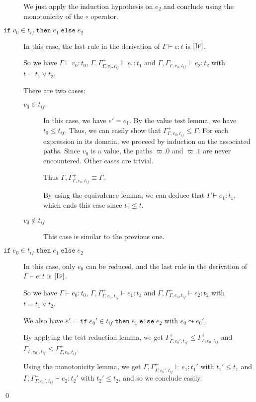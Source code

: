 \documentclass[a4paper]{article}%
\newcommand{\ite}[4]{\ensuremath{\texttt{if}\;#1\in#2\;\texttt{then}\;#3\;\texttt{else}\;#4}}
\theoremstyle{definition}
\newcommand {\Rule}[1] {[\textsc{#1}]}
\begin{document}
\begin{description}
      We just apply the induction hypothesis on $e_2$ and conclude using the monotonicity of the $\circ$ operator.
      \item[$\ite {v_0} {t_{if}} {e_1} {e_2}$] In this case, the last rule in the derivation of $\Gamma \vdash e:t$ is $\Rule{If}$.
       
      So we have $\Gamma \vdash v_0 : t_0$, $\Gamma, \Gamma^+_{\Gamma,v_0,t_{if}}\vdash e_1 : t_1$ and $\Gamma, \Gamma^-_{\Gamma,v_0,t_{if}}\vdash e_2 : t_2$ with $t=t_1\vee t_2$.

      There are two cases:
      \begin{description}
        \item[$v_0 \in t_{if}$] In this case, we have $e'=e_1$.
        By the value test lemma, we have $t_0 \leq t_{if}$.
        Thus, we can easily show that $\Gamma^+_{\Gamma,v_0,t_{if}} \leq \Gamma$:
        For each expression in its domain, we proceed by induction on the associated paths.
        Since $v_0$ is a value, the paths $\varpi.0$ and $\varpi.1$ are never encountered. Other cases are trivial.

        Thus $\Gamma, \Gamma^+_{\Gamma,v_0,t_{if}} \equiv \Gamma$.

        By using the equivalence lemma, we can deduce that $\Gamma \vdash e_1 : t_1$, which ends this case since $t_1 \leq t$.
        \item[$v_0 \not\in t_{if}$] This case is similar to the previous one.
      \end{description}
        
      \item[$\ite {e_0} {t_{if}} {e_1} {e_2}$] In this case, only $e_0$ can be reduced, and the last rule in the derivation of $\Gamma \vdash e:t$ is $\Rule{If}$.
      
      So we have $\Gamma \vdash e_0 : t_0$, $\Gamma, \Gamma^+_{\Gamma,e_0,t_{if}}\vdash e_1 : t_1$ and $\Gamma, \Gamma^-_{\Gamma,e_0,t_{if}}\vdash e_2 : t_2$ with $t=t_1\vee t_2$.
      
      We also have $e'=\ite {e_0'} {t_{if}} {e_1} {e_2}$ with $e_0\leadsto e_0'$.

      By applying the test reduction lemma, we get $\Gamma^+_{\Gamma,e_0',t_{if}} \leq \Gamma^+_{\Gamma,e_0,t_{if}}$ and
      $\Gamma^-_{\Gamma,e_0',t_{if}} \leq \Gamma^+_{\Gamma,e_0,t_{if}}$.

      Using the monotonicity lemma, we get $\Gamma, \Gamma^+_{\Gamma,e_0',t_{if}}\vdash e_1 : t_1'$ with $t_1'\leq t_1$
      and $\Gamma, \Gamma^-_{\Gamma,e_0',t_{if}}\vdash e_2 : t_2'$ with $t_2'\leq t_2$, and so we conclude easily.
    \end{description}

    \qed
\end{document}

